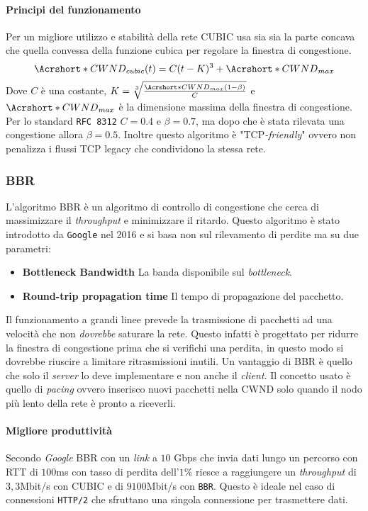             \paragraph{Principi del funzionamento} Per un migliore utilizzo e stabilità della rete \Acrshort*{CUBIC} usa sia sia la parte concava che quella convessa della funzione cubica per regolare la finestra di congestione. 
            $$
                \Acrshort*{CWND}_{cubic}(t) = C(t-K)^3 + \Acrshort*{CWND}_{max}
            $$
            Dove $ C $ è una costante, $ K = \sqrt[3]{\frac{\Acrshort*{CWND}_{max}(1-\beta)}{C}} $ e $ \Acrshort*{CWND}_{max} $ è la dimensione massima della finestra di congestione. Per lo standard \texttt{\Acrshort*{RFC} 8312} $ C = 0.4 $ e $ \beta = 0.7 $, ma dopo che è stata rilevata una congestione allora $ \beta = 0.5 $. Inoltre questo algoritmo è "\Acrshort*{TCP}\textit{-friendly}" ovvero non penalizza i flussi \Acrshort*{TCP} legacy che condividono la stessa rete.
        \subsubsection{\acrfull*{BBR}}
            L'algoritmo \Acrshort*{BBR} è un algoritmo di controllo di congestione che cerca di massimizzare il \textit{throughput} e minimizzare il ritardo. Questo algoritmo è stato introdotto da \texttt{Google} nel 2016 e si basa non sul rilevamento di perdite ma su due parametri: \begin{itemize}
                \item \textbf{Bottleneck Bandwidth} La banda disponibile sul \textit{bottleneck}.
                \item \textbf{Round-trip propagation time} Il tempo di propagazione del pacchetto.
            \end{itemize}
            Il funzionamento a grandi linee prevede la trasmissione di pacchetti ad una velocità che non \textit{dovrebbe} saturare la rete. Questo infatti è progettato per ridurre la finestra di congestione prima che si verifichi una perdita, in questo modo si dovrebbe riuscire a limitare ritrasmissioni inutili. Un vantaggio di \Acrshort*{BBR} è quello che solo il \textit{server} lo deve implementare e non anche il \textit{client}. Il concetto usato è quello di \textit{pacing} ovvero inserisco nuovi pacchetti nella \Acrshort*{CWND} solo quando il nodo più lento della rete è pronto a riceverli.
            \paragraph{Migliore produttività} Secondo \textit{Google} \Acrshort*{BBR} con un \textit{link} a $10$ Gbps che invia dati lungo un percorso con \Acrshort*{RTT} di $100$ms con tasso di perdita dell'$1\%$ riesce a raggiungere un \textit{throughput} di $3,3$Mbit/s con \Acrshort*{CUBIC} e di $9100$Mbit/s con \texttt{BBR}. Questo è ideale nel caso di connessioni \texttt{\Acrshort*{HTTP}/2} che sfruttano una singola connessione per trasmettere dati.
